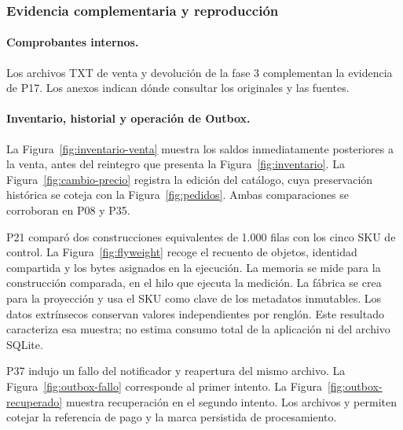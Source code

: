 \clearpage
\subsubsection{Evidencia complementaria y reproducción}
\paragraph{Comprobantes internos.}
Los archivos TXT de venta y devolución de la fase 3 complementan la evidencia de P17. Los anexos indican dónde consultar los originales y las fuentes.

\paragraph{Inventario, historial y operación de Outbox.}
La Figura~\ref{fig:inventario-venta} muestra los saldos inmediatamente posteriores a la venta, antes del reintegro que presenta la Figura~\ref{fig:inventario}. La Figura~\ref{fig:cambio-precio} registra la edición del catálogo, cuya preservación histórica se coteja con la Figura~\ref{fig:pedidos}. Ambas comparaciones se corroboran en P08 y P35.
\clearpage
{}

\clearpage
P21 comparó dos construcciones equivalentes de 1.000 filas con los cinco SKU de control. La Figura~\ref{fig:flyweight} recoge el recuento de objetos, identidad compartida y los bytes asignados en la ejecución. La memoria se mide para la construcción comparada, en el hilo que ejecuta la medición.
La fábrica se crea para la proyección y usa el SKU como clave de los metadatos inmutables. Los datos extrínsecos conservan valores independientes por renglón. Este resultado caracteriza esa muestra; no estima consumo total de la aplicación ni del archivo SQLite.

\clearpage
P37 indujo un fallo del notificador y reapertura del mismo archivo. La Figura~\ref{fig:outbox-fallo} corresponde al primer intento. La Figura~\ref{fig:outbox-recuperado} muestra recuperación en el segundo intento. Los archivos  y  permiten cotejar la referencia de pago y la marca persistida de procesamiento.

